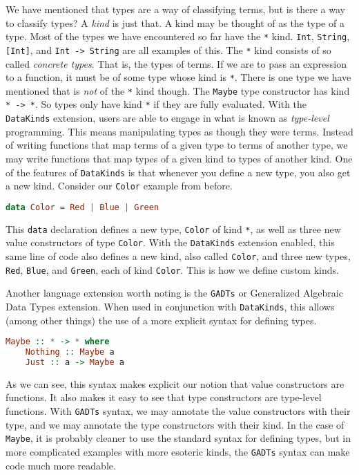 \documentclass[MS, xcolor=dvipsnames]{wfuthesis}
\theoremstyle{definition}
\begin{document}
We have mentioned that types are a way of classifying terms, but is there a way to classify types? A \emph{kind} is just that. A kind may be thought of as the type of a type. Most of the types we have encountered so far have the \lstinline{*} kind. \lstinline{Int}, \lstinline{String}, \lstinline{[Int]}, and \lstinline{Int -> String} are all examples of this. The \lstinline{*} kind consists of so called \emph{concrete types}. That is, the types of terms. If we are to pass an expression to a function, it must be of some type whose kind is \lstinline{*}. There is one type we have mentioned that is \emph{not} of the \lstinline{*} kind though. The \lstinline{Maybe} type constructor has kind \lstinline{* -> *}. So types only have kind \lstinline{*} if they are fully evaluated. With the \lstinline{DataKinds} extension, users are able to engage in what is known as \emph{type-level} programming. This means manipulating types as though they were terms. Instead of writing functions that map terms of a given type to terms of another type, we may write functions that map types of a given kind to types of another kind. One of the features of \lstinline{DataKinds} is that whenever you define a new type, you also get a new kind. Consider our \lstinline{Color} example from before. 
\begin{lstlisting}[language=Haskell]
data Color = Red | Blue | Green
\end{lstlisting}
This \lstinline{data} declaration defines a new type, \lstinline{Color} of kind \lstinline{*}, as well as three new value constructors of type \lstinline{Color}. With the \lstinline{DataKinds} extension enabled, this same line of code also defines a new kind, also called \lstinline{Color}, and three new types, \lstinline{Red}, \lstinline{Blue}, and \lstinline{Green}, each of kind \lstinline{Color}. This is how we define custom kinds. \par 
Another language extension worth noting is the \lstinline{GADTs} or Generalized Algebraic Data Types extension. When used in conjunction with \lstinline{DataKinds}, this allows (among other things) the use of a more explicit syntax for defining types. 
\begin{lstlisting}[language=Haskell]
Maybe :: * -> * where
    Nothing :: Maybe a
    Just :: a -> Maybe a
\end{lstlisting}
As we can see, this syntax makes explicit our notion that value constructors are functions. It also makes it easy to see that type constructors are type-level functions. With \lstinline{GADTs} syntax, we may annotate the value constructors with their type, and we may annotate the type constructors with their kind. In the case of \lstinline{Maybe}, it is probably cleaner to use the standard syntax for defining types, but in more complicated examples with more esoteric kinds, the \lstinline{GADTs} syntax can make code much more readable. \par 
\end{document}
